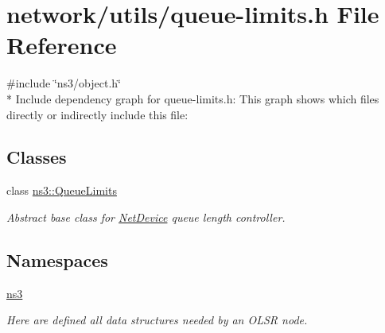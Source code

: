 \hypertarget{queue-limits_8h}{}\section{network/utils/queue-\/limits.h File Reference}
\label{queue-limits_8h}
{\ttfamily \#include \char`\"{}ns3/object.\+h\char`\"{}}\\*
Include dependency graph for queue-\/limits.h\+:
This graph shows which files directly or indirectly include this file\+:
\subsection*{Classes}
\begin{DoxyCompactItemize}
\item 
class \hyperlink{classns3_1_1QueueLimits}{ns3\+::\+Queue\+Limits}
\begin{DoxyCompactList}\small\item\em Abstract base class for \hyperlink{classns3_1_1NetDevice}{Net\+Device} queue length controller. \end{DoxyCompactList}\end{DoxyCompactItemize}
\subsection*{Namespaces}
\begin{DoxyCompactItemize}
\item 
 \hyperlink{namespacens3}{ns3}
\begin{DoxyCompactList}\small\item\em Here are defined all data structures needed by an O\+L\+SR node. \end{DoxyCompactList}\end{DoxyCompactItemize}
